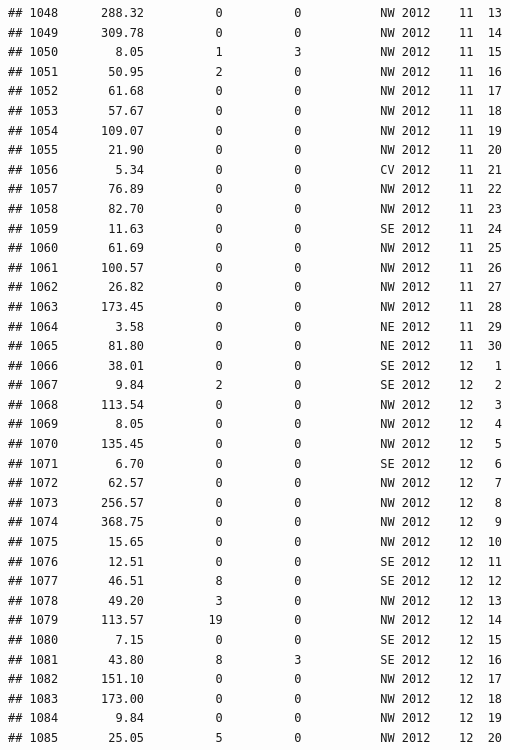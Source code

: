 \documentclass[
]{article}
\begin{document}
\begin{verbatim}
## 1048      288.32          0          0           NW 2012    11  13
## 1049      309.78          0          0           NW 2012    11  14
## 1050        8.05          1          3           NW 2012    11  15
## 1051       50.95          2          0           NW 2012    11  16
## 1052       61.68          0          0           NW 2012    11  17
## 1053       57.67          0          0           NW 2012    11  18
## 1054      109.07          0          0           NW 2012    11  19
## 1055       21.90          0          0           NW 2012    11  20
## 1056        5.34          0          0           CV 2012    11  21
## 1057       76.89          0          0           NW 2012    11  22
## 1058       82.70          0          0           NW 2012    11  23
## 1059       11.63          0          0           SE 2012    11  24
## 1060       61.69          0          0           NW 2012    11  25
## 1061      100.57          0          0           NW 2012    11  26
## 1062       26.82          0          0           NW 2012    11  27
## 1063      173.45          0          0           NW 2012    11  28
## 1064        3.58          0          0           NE 2012    11  29
## 1065       81.80          0          0           NE 2012    11  30
## 1066       38.01          0          0           SE 2012    12   1
## 1067        9.84          2          0           SE 2012    12   2
## 1068      113.54          0          0           NW 2012    12   3
## 1069        8.05          0          0           NW 2012    12   4
## 1070      135.45          0          0           NW 2012    12   5
## 1071        6.70          0          0           SE 2012    12   6
## 1072       62.57          0          0           NW 2012    12   7
## 1073      256.57          0          0           NW 2012    12   8
## 1074      368.75          0          0           NW 2012    12   9
## 1075       15.65          0          0           NW 2012    12  10
## 1076       12.51          0          0           SE 2012    12  11
## 1077       46.51          8          0           SE 2012    12  12
## 1078       49.20          3          0           NW 2012    12  13
## 1079      113.57         19          0           NW 2012    12  14
## 1080        7.15          0          0           SE 2012    12  15
## 1081       43.80          8          3           SE 2012    12  16
## 1082      151.10          0          0           NW 2012    12  17
## 1083      173.00          0          0           NW 2012    12  18
## 1084        9.84          0          0           NW 2012    12  19
## 1085       25.05          5          0           NW 2012    12  20

\end{verbatim}
\end{document}
